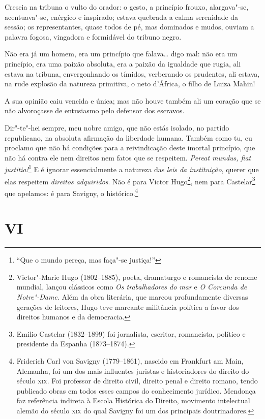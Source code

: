 Crescia na tribuna o vulto do orador: o gesto, a princípio frouxo,
alargava"-se, acentuava"-se, enérgico e inspirado; estava quebrada a calma
serenidade da sessão; os representantes, quase todos de pé, mas
dominados e mudos, ouviam a palavra fogosa, vingadora e formidável do
tribuno negro.

Não era já um homem, era um princípio que falava\ldots{} digo mal: não era um
princípio, era uma paixão absoluta, era a paixão da igualdade que rugia,
ali estava na tribuna, envergonhando os tímidos, verberando os
prudentes, ali estava, na rude explosão da natureza primitiva, o neto
d'África, o filho de Luiza Mahin!

A sua opinião caiu vencida e única; mas não houve também ali um coração
que se não alvoroçasse de entusiasmo pelo defensor dos escravos.

Dir"-te"-hei sempre, meu nobre amigo, que não estás isolado, no partido
republicano, na absoluta afirmação da liberdade humana. Também como tu,
eu proclamo que não há condições para a reivindicação deste imortal
princípio, que não há contra ele nem direitos nem fatos que se
respeitem. \emph{Pereat mundus, fiat justitia!}\footnote{``Que o mundo
  pereça, mas faça"-se justiça!''} E é ignorar essencialmente a natureza
das \emph{leis da instituição}, querer que elas respeitem \emph{direitos
adquiridos}. Não é para Victor Hugo\footnote{Victor"-Marie Hugo
  (1802--1885), poeta, dramaturgo e romancista de renome mundial, lançou
  clássicos como \emph{Os trabalhadores do mar} e \emph{O Corcunda de Notre"-Dame}.
  Além da obra literária, que marcou profundamente diversas gerações de
  leitores, Hugo teve marcante militância política a favor dos direitos
  humanos e da democracia.}, nem para Castelar\footnote{Emilio
  Castelar (1832--1899) foi jornalista, escritor, romancista, político e
  presidente da Espanha (1873--1874).} que apelamos: é para Savigny, o
histórico.\footnote{Friderich Carl von Savigny (1779--1861), nascido em
  Frankfurt am Main, Alemanha, foi um dos mais influentes juristas e
  historiadores do direito do século \textsc{xix}. Foi professor de direito
  civil, direito penal e direito romano, tendo publicado obras em todos
  esses campos do conhecimento jurídico. Mendonça faz referência
  indireta à Escola Histórica do Direito, movimento intelectual alemão
  do século \textsc{xix} do qual Savigny foi um dos principais doutrinadores.}

\section*{VI}

